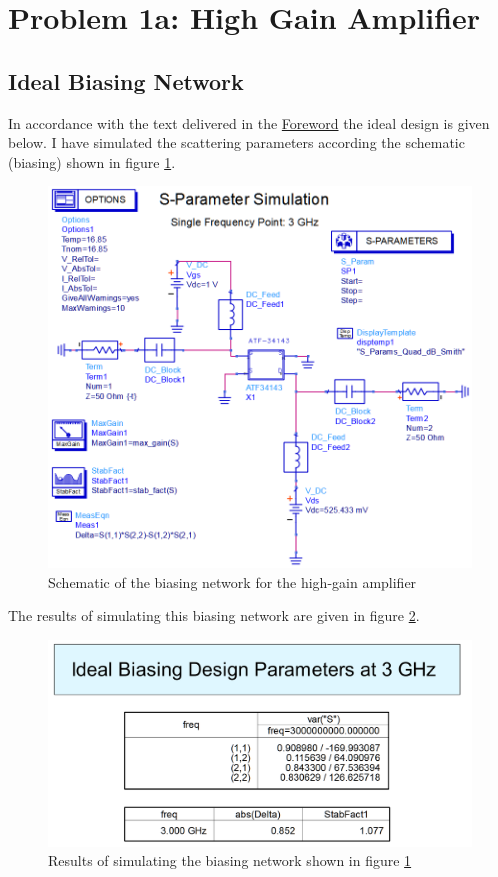 \section{Problem 1a: High Gain Amplifier}
\label{sec:A2P1}

\subsection{Ideal Biasing Network}
In accordance with the text delivered in the \hyperref[sec:Foreword]{Foreword}
the ideal design is given below. I have simulated the scattering parameters
according the schematic (biasing) shown in figure
\ref{fig:A2P1IdealSchematic}.

\begin{figure}[H]
    \centering
    \includegraphics[width=0.8\linewidth]{Images/A2P1IdealSchematic.png}
    \caption{Schematic of the biasing network for the high-gain amplifier}
    \label{fig:A2P1IdealSchematic}
\end{figure}

The results of simulating this biasing network are given in figure
\ref{fig:A2P1IdealBiasingResults}.

\begin{figure}[H]
    \centering
    \includegraphics[width=0.8\linewidth]{Images/A2P1IdealBiasingResults}
    \caption{Results of simulating the biasing network shown in figure
    \ref{fig:A2P1IdealSchematic}}
    \label{fig:A2P1IdealBiasingResults}
\end{figure}


